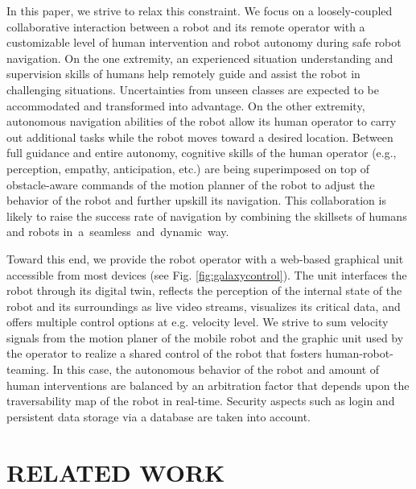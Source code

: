 \documentclass[letterpaper, 10 pt, conference]{ieeeconf}  %
\begin{document}
In this paper, we strive to relax this constraint. We focus on a loosely-coupled collaborative interaction between a  robot and its remote operator  with a customizable level of human intervention and robot autonomy during  safe robot navigation. On the one extremity, an experienced situation understanding and  supervision skills of humans help remotely guide and assist the robot in challenging situations. Uncertainties from unseen classes are expected to be  accommodated and transformed into advantage. On the other extremity, autonomous navigation abilities of the robot allow its human operator to carry out additional tasks while the robot moves toward a desired location. Between full guidance and entire autonomy, cognitive skills of the human operator (e.g., perception, empathy, anticipation, etc.) are being superimposed on top of obstacle-aware commands of the motion planner of the robot to  adjust the behavior of the robot and further upskill its navigation. This collaboration is likely to raise the success rate of  navigation by combining the skillsets of humans and robots \mbox{in a seamless and dynamic way.}



Toward this end, we  provide the robot operator with a web-based graphical unit accessible from most devices (see Fig. \ref{fig:galaxycontrol}). The unit interfaces the robot through its digital twin, reflects the perception of the internal state of the robot and its surroundings as live video streams, visualizes its critical data, and offers multiple control options at e.g. velocity level. We strive to sum  velocity signals from the motion planer of the mobile robot and the graphic unit used by the operator to realize a shared control \cite{phri} of the robot that fosters human-robot-teaming. In this case, the  autonomous behavior of the robot and amount of human interventions are  balanced by an arbitration factor that depends upon the traversability map of the robot in real-time. Security aspects such as login and persistent data storage via a database are taken into account. 









\section{RELATED WORK}
\end{document}
